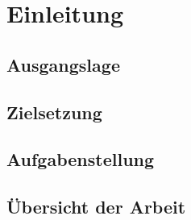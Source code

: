 \chapter{Einleitung}
\section{Ausgangslage}
\section{Zielsetzung}
\section{Aufgabenstellung}
\section{Übersicht der Arbeit}
